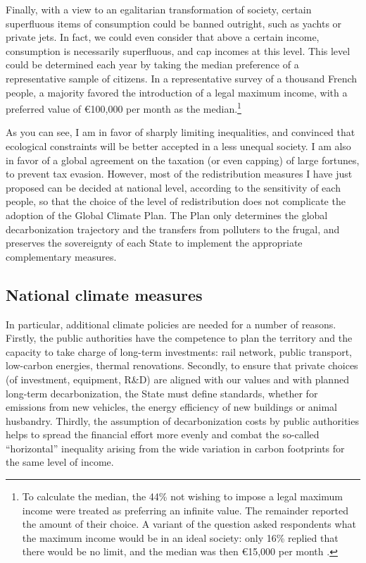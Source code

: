 \documentclass[a5paper,english,openany]{memoir}
\begin{document}
Finally, with a view to an egalitarian transformation of society, certain superfluous items of consumption could be banned outright, such as yachts or private jets. In fact, we could even consider that above a certain income, consumption is necessarily superfluous, and cap incomes at this level. This level could be determined each year by taking the median preference of a representative sample of citizens. In a representative survey of a thousand French people, a majority favored the introduction of a legal maximum income, with a preferred value of \euro{}100,000 per month as the median.\footnote{To calculate the median, the 44\% not wishing to impose a legal maximum income were treated as preferring an infinite value. The remainder reported the amount of their choice. A variant of the question asked respondents what the maximum income would be in an ideal society: only 16\% replied that there would be no limit, and the median was then \euro{}15,000 per month \citep{fabre_determiner_2022}.} 

As you can see, I am in favor of sharply limiting inequalities, and convinced that ecological constraints will be better accepted in a less unequal society. I am also in favor of a global agreement on the taxation (or even capping) of large fortunes, to prevent tax evasion. However, most of the redistribution measures I have just proposed can be decided at national level, according to the sensitivity of each people, so that the choice of the level of redistribution does not complicate the adoption of the Global Climate Plan. The Plan only determines the global decarbonization trajectory and the transfers from polluters to the frugal, and preserves the sovereignty of each State to implement the appropriate complementary measures.

\subsection{National climate measures} %

In particular, additional climate policies are needed for a number of reasons. Firstly, the public authorities have the competence to plan the territory and the capacity to take charge of long-term investments: rail network, public transport, low-carbon energies, thermal renovations. Secondly, to ensure that private choices (of investment, equipment, R\&D) are aligned with our values and with planned long-term decarbonization, the State must define standards, whether for emissions from new vehicles, the energy efficiency of new buildings or animal husbandry. %
Thirdly, the assumption of decarbonization costs by public authorities helps to spread the financial effort more evenly and combat the so-called ``horizontal'' inequality arising from the wide variation in carbon footprints for the same level of income. %
\end{document}
